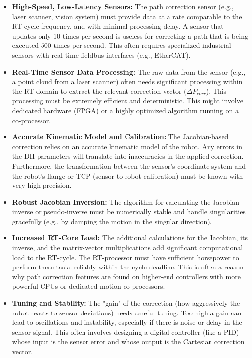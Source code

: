 \begin{itemize}
    \item \textbf{High-Speed, Low-Latency Sensors:} The path correction sensor (e.g., laser scanner, vision system) must provide data at a rate comparable to the RT-cycle frequency, and with minimal processing delay. A sensor that updates only 10 times per second is useless for correcting a path that is being executed 500 times per second. This often requires specialized industrial sensors with real-time fieldbus interfaces (e.g., EtherCAT).
    \item \textbf{Real-Time Sensor Data Processing:} The raw data from the sensor (e.g., a point cloud from a laser scanner) often needs significant processing within the RT-domain to extract the relevant correction vector (\(\Delta P_{corr}\)). This processing must be extremely efficient and deterministic. This might involve dedicated hardware (FPGA) or a highly optimized algorithm running on a co-processor.
    \item \textbf{Accurate Kinematic Model and Calibration:} The Jacobian-based correction relies on an accurate kinematic model of the robot. Any errors in the DH parameters will translate into inaccuracies in the applied correction. Furthermore, the transformation between the sensor's coordinate system and the robot's flange or TCP (sensor-to-robot calibration) must be known with very high precision.
    \item \textbf{Robust Jacobian Inversion:} The algorithm for calculating the Jacobian inverse or pseudo-inverse must be numerically stable and handle singularities gracefully (e.g., by damping the motion in the singular direction).
    \item \textbf{Increased RT-Core Load:} The additional calculations for the Jacobian, its inverse, and the matrix-vector multiplications add significant computational load to the RT-cycle. The RT-processor must have sufficient horsepower to perform these tasks reliably within the cycle deadline. This is often a reason why path correction features are found on higher-end controllers with more powerful CPUs or dedicated motion co-processors.
    \item \textbf{Tuning and Stability:} The "gain" of the correction (how aggressively the robot reacts to sensor deviations) needs careful tuning. Too high a gain can lead to oscillations and instability, especially if there is noise or delay in the sensor signal. This often involves designing a digital controller (like a PID) whose input is the sensor error and whose output is the Cartesian correction vector.
\end{itemize}

